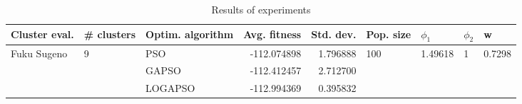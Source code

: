 \begin{table}
\centering
\caption{Results of experiments}
\begin{tabular}{lllrrllll}
\toprule
               Cluster eval. &        \# clusters & Optim. algorithm &  Avg. fitness &  Std. dev. &            Pop. size &               $\phi_{1}$ &         $\phi_{2}$ &                       w \\
\midrule
\multirow{3}{*}{Fuku Sugeno} & \multirow{3}{*}{9} &              PSO &   -112.074898 &   1.796888 & \multirow{3}{*}{100} & \multirow{3}{*}{1.49618} & \multirow{3}{*}{1} & \multirow{3}{*}{0.7298} \\
                             &                    &            GAPSO &   -112.412457 &   2.712700 &                      &                          &                    &                         \\
                             &                    &          LOGAPSO &   -112.994369 &   0.395832 &                      &                          &                    &                         \\
\bottomrule
\end{tabular}
\end{table}

